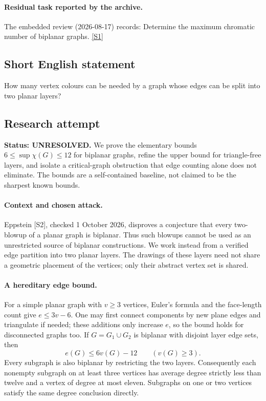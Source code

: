 \documentclass[11pt,a4paper]{article}
\newcommand{\sref}[2]{\hyperlink{source:#1:#2}{[S#2]}}
\begin{document}
\paragraph{Residual task reported by the archive.}

The embedded review (2026-08-17) records: Determine the maximum chromatic number of biplanar graphs. \sref{1396}{1}

\subsection{Short English statement}

How many vertex colours can be needed by a graph whose edges can be split into two planar layers?

\subsection{Research attempt}
\textbf{Status: UNRESOLVED.} We prove the elementary bounds $6\le\sup\chi(G)\le12$ for biplanar graphs, refine the upper bound for triangle-free layers, and isolate a critical-graph obstruction that edge counting alone does not eliminate. The bounds are a self-contained baseline, not claimed to be the sharpest known bounds.

\paragraph{Context and chosen attack.}
Eppstein [S2], checked 1 October 2026, disproves a conjecture that every two-blowup of a planar graph is biplanar. Thus such blowups cannot be used as an unrestricted source of biplanar constructions. We work instead from a verified edge partition into two planar layers. The drawings of these layers need not share a geometric placement of the vertices; only their abstract vertex set is shared.

\paragraph{A hereditary edge bound.}
For a simple planar graph with $v\ge3$ vertices, Euler's formula and the face-length count give $e\le3v-6$. One may first connect components by new plane edges and triangulate if needed; these additions only increase $e$, so the bound holds for disconnected graphs too. If $G=G_1\cup G_2$ is biplanar with disjoint layer edge sets, then
\[
e(G)\le6v(G)-12\qquad(v(G)\ge3).
\]
Every subgraph is also biplanar by restricting the two layers. Consequently each nonempty subgraph on at least three vertices has average degree strictly less than twelve and a vertex of degree at most eleven. Subgraphs on one or two vertices satisfy the same degree conclusion directly.
\end{document}
